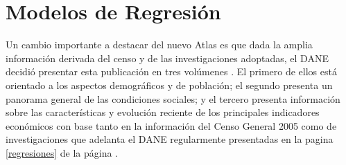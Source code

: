 \documentclass{article}
\begin{document}
\section{Modelos de Regresión}

Un cambio importante a destacar del nuevo Atlas es que dada la amplia información derivada del censo y de las investigaciones adoptadas, el DANE decidió presentar esta publicación en tres volúmenes \cite{gutierrez_cesar_nodate-1}. El primero de ellos está orientado a los aspectos demográficos y de población; el segundo presenta un panorama general de las condiciones sociales;\cite{panesso-hernandez_localizacion_nodate,} y el tercero presenta información sobre las características y evolución reciente de los principales indicadores económicos con base tanto en la información del Censo General 2005 como de investigaciones que adelanta el DANE regularmente presentadas en la pagina \ref{regresiones} de la página \pageref{regresiones}.
\end{document}
